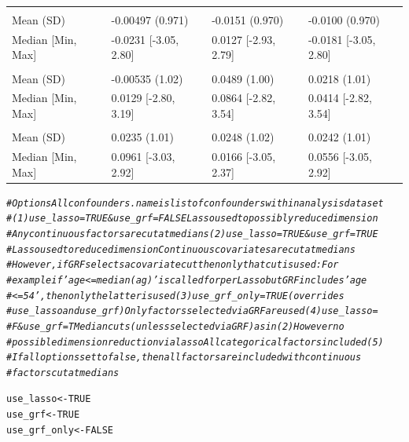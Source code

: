 \documentclass[smallextended]{svjour3}
\makeatletter
\newcommand{\hlnum}[1]{\textcolor[rgb]{0.686,0.059,0.569}{#1}}%
\newcommand{\hlcom}[1]{\textcolor[rgb]{0.678,0.584,0.686}{\textit{#1}}}%
\newcommand{\hlstd}[1]{\textcolor[rgb]{0.345,0.345,0.345}{#1}}%
\newcommand{\hlkwb}[1]{\textcolor[rgb]{0.69,0.353,0.396}{#1}}%
\newenvironment{kframe}{%
 \def\at@end@of@kframe{}%
 \ifinner\ifhmode%
  \def\at@end@of@kframe{\end{minipage}}%
  \begin{minipage}{\columnwidth}%
 \fi\fi%
 \def\FrameCommand##1{\hskip\@totalleftmargin \hskip-\fboxsep
 \colorbox{shadecolor}{##1}\hskip-\fboxsep
     \hskip-\linewidth \hskip-\@totalleftmargin \hskip\columnwidth}%
 \MakeFramed {\advance\hsize-\width
   \@totalleftmargin\z@ \linewidth\hsize
   \@setminipage}}%
 {\par\unskip\endMakeFramed%
 \at@end@of@kframe}
\newenvironment{knitrout}{}{} %
\makeatother
\begin{document}
\begin{knitrout}
\begin{tabular}[t]{llll}
\addlinespace[0.3em]
\multicolumn{4}{l}{\textbf{noise1}}\\
\hspace{1em}Mean (SD) & -0.00497 (0.971) & -0.0151 (0.970) & -0.0100 (0.970)\\
\hspace{1em}Median [Min, Max] & -0.0231 [-3.05, 2.80] & 0.0127 [-2.93, 2.79] & -0.0181 [-3.05, 2.80]\\
\addlinespace[0.3em]
\multicolumn{4}{l}{\textbf{noise2}}\\
\hspace{1em}Mean (SD) & -0.00535 (1.02) & 0.0489 (1.00) & 0.0218 (1.01)\\
\hspace{1em}Median [Min, Max] & 0.0129 [-2.80, 3.19] & 0.0864 [-2.82, 3.54] & 0.0414 [-2.82, 3.54]\\
\addlinespace[0.3em]
\multicolumn{4}{l}{\textbf{noise3}}\\
\hspace{1em}Mean (SD) & 0.0235 (1.01) & 0.0248 (1.02) & 0.0242 (1.01)\\
\hspace{1em}Median [Min, Max] & 0.0961 [-3.03, 2.92] & 0.0166 [-3.05, 2.37] & 0.0556 [-3.05, 2.92]\\
\bottomrule
\end{tabular}

\begin{kframe}\begin{alltt}
\hlcom{# Options Allconfounders.name is list of confounders within analysis dataset}
\hlcom{# (1) use_lasso=TRUE & use_grf=FALSE Lasso used to possibly reduce dimension}
\hlcom{# Any continuous factors are cut at medians (2) use_lasso=TRUE & use_grf=TRUE}
\hlcom{# Lasso used to reduce dimension Continuous covariates are cut at medians}
\hlcom{# However, if GRF selects a covariate cut then only that cut is used: For}
\hlcom{# example if 'age <= median(ag)' is called for per Lasso but GRF includes 'age}
\hlcom{# <= 54', then only the latter is used (3) use_grf_only = TRUE (overrides}
\hlcom{# use_lasso and use_grf) Only factors selected via GRF are used (4) use_lasso =}
\hlcom{# F & use_grf =T Median cuts (unless selected via GRF) as in (2) However no}
\hlcom{# possible dimension reduction via lasso All categorical factors included (5)}
\hlcom{# If all options set to false, then all factors are included with continuous}
\hlcom{# factors cut at medians}

\hlstd{use_lasso} \hlkwb{<-} \hlnum{TRUE}
\hlstd{use_grf} \hlkwb{<-} \hlnum{TRUE}
\hlstd{use_grf_only} \hlkwb{<-} \hlnum{FALSE}


\end{alltt}
\end{kframe}
\end{knitrout}
\end{document}
